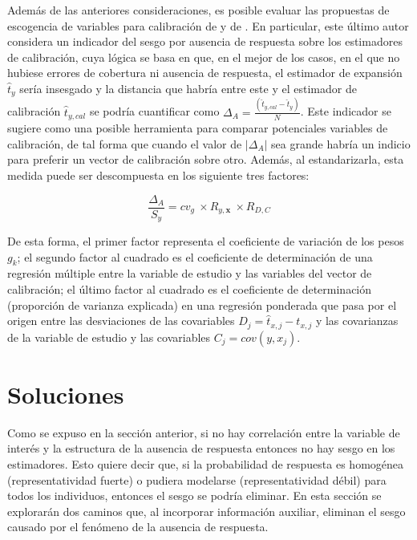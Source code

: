 \documentclass[
  12pt,
]{book}
\begin{document}
Además de las anteriores consideraciones, es posible evaluar las propuestas de escogencia de variables para calibración de \citet{KaltonFloresCervantes_2003} y de \citet{Sarndal_2011}. En particular, este último autor considera un indicador del sesgo por ausencia de respuesta sobre los estimadores de calibración, cuya lógica se basa en que, en el mejor de los casos, en el que no hubiese errores de cobertura ni ausencia de respuesta, el estimador de expansión \(\hat{t}_{y}\) sería insesgado y la distancia que habría entre este y el estimador de calibración \(\hat{t}_{y,cal}\) se podría cuantificar como \(\Delta_A = \frac{(\hat{t}_{y,cal} - \hat{t}_{y})}{N}\). Este indicador se sugiere como una posible herramienta para comparar potenciales variables de calibración, de tal forma que cuando el valor de \(|\Delta_A|\) sea grande habría un indicio para preferir un vector de calibración sobre otro. Además, al estandarizarla, esta medida puede ser descompuesta en los siguiente tres factores:

\[\frac{\Delta_A}{S_y} = cv_g \ \times R_{y,\mathbf{x}} \ \times R_{D,C}\]

De esta forma, el primer factor representa el coeficiente de variación de los pesos \(g_k\); el segundo factor al cuadrado es el coeficiente de determinación de una regresión múltiple entre la variable de estudio y las variables del vector de calibración; el último factor al cuadrado es el coeficiente de determinación (proporción de varianza explicada) en una regresión ponderada que pasa por el origen entre las desviaciones de las covariables \(D_j = \hat{t}_{x, j} - t_{x,j}\) y las covarianzas de la variable de estudio y las covariables \(C_j = cov(y, x_j)\).

\hypertarget{soluciones}{%
\section{Soluciones}\label{soluciones}}

Como se expuso en la sección anterior, si no hay correlación entre la variable de interés y la estructura de la ausencia de respuesta entonces no hay sesgo en los estimadores. Esto quiere decir que, si la probabilidad de respuesta es homogénea (representatividad fuerte) o pudiera modelarse (representatividad débil) para todos los individuos, entonces el sesgo se podría eliminar. En esta sección se explorarán dos caminos que, al incorporar información auxiliar, eliminan el sesgo causado por el fenómeno de la ausencia de respuesta.
\end{document}
